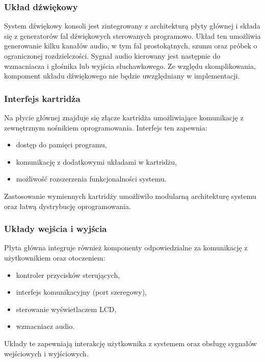 \documentclass{article}
\begin{document}
\subsubsection{Układ dźwiękowy}

System dźwiękowy konsoli jest zintegrowany z architekturą płyty głównej i składa się z generatorów fal dźwiękowych sterowanych programowo. Układ ten umożliwia generowanie kilku kanałów audio, w tym fal prostokątnych, szumu oraz próbek o ograniczonej rozdzielczości. Sygnał audio kierowany jest następnie do wzmacniacza i głośnika lub wyjścia słuchawkowego. Ze względu skomplikowania, kompoment układu dźwiękowego nie będzie uwzględniany w implementacji.

\subsubsection{Interfejs kartridża}

Na płycie głównej znajduje się złącze kartridża umożliwiające komunikację z zewnętrznym nośnikiem oprogramowania. Interfejs ten zapewnia:

\begin{itemize}
	\item dostęp do pamięci programu,
	\item komunikację z dodatkowymi układami w kartridżu,
	\item możliwość rozszerzenia funkcjonalności systemu.
\end{itemize}

Zastosowanie wymiennych kartridży umożliwiło modularną architekturę systemu oraz łatwą dystrybucję oprogramowania.

\subsubsection{Układy wejścia i wyjścia}

Płyta główna integruje również komponenty odpowiedzialne za komunikację z użytkownikiem oraz otoczeniem:

\begin{itemize}
	\item kontroler przycisków sterujących,
	\item interfejs komunikacyjny (port szeregowy),
	\item sterowanie wyświetlaczem LCD,
	\item wzmacniacz audio.
\end{itemize}

Układy te zapewniają interakcję użytkownika z systemem oraz obsługę sygnałów wejściowych i wyjściowych.
\end{document}
